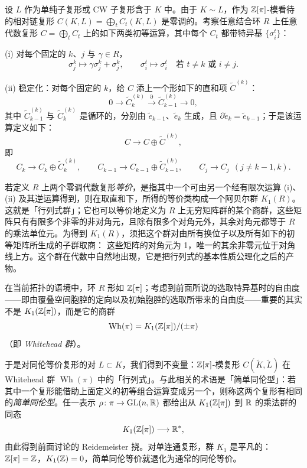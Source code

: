 设 $L$ 作为单纯子复形或 CW 子复形含于 $K$ 中。由于 $K\sim L$，作为 $\mathbb{Z}[\pi]$-模看待的相对链复形 $C(K,L)=\bigoplus_t C_t(K,L)$ 是零调的。考察任意结合环 $R$ 上任意代数复形 $C=\bigoplus_t C_t$ 上的如下两类初等运算，其中每个 $C_t$ 都带特异基 $\{\sigma^t_i\}$：

(i) 对每个固定的 $k$、$j$ 与 $\gamma\in R$，
\begin{equation}
  \sigma^k_j\mapsto\gamma\sigma^k_j+\sigma^k_j,\qquad
  \sigma^t_i\mapsto\sigma^t_i\quad\text{若 } t\neq k \text{ 或 } i\neq j. \tag{5.15}
\end{equation}

(ii) 稳定化：对每个固定的 $k$，给 $C$ 添上一个形如下的直和项 $\tilde C^{(k)}$：
\begin{equation}
  0\longrightarrow\tilde C^{(k)}_k\xrightarrow{\partial}\tilde C^{(k)}_{k-1}\longrightarrow 0, \tag{5.16}
\end{equation}
其中 $\tilde C^{(k)}_{k-1}$ 与 $\tilde C^{(k)}_k$ 是循环的，分别由 $\tilde e_{k-1}$、$\tilde e_k$ 生成，且 $\partial\tilde e_k=\tilde e_{k-1}$；于是该运算定义如下：
\[
  C\longrightarrow C\oplus\tilde C^{(k)},
\]
即
\begin{equation}
  C_k\longrightarrow C_k\oplus\tilde C^{(k)}_k,\qquad C_{k-1}\longrightarrow C_{k-1}\oplus\tilde C^{(k)}_{k-1},\qquad C_j\longrightarrow C_j\ \ (j\neq k-1,k). \tag{5.17}
\end{equation}

若定义 $R$ 上两个零调代数复形\emph{等价}，是指其中一个可由另一个经有限次运算 (i)、(ii) 及其逆运算得到，则在取直和下，所得的等价类构成一个阿贝尔群 $K_1(R)$。这就是「行列式群」；它也可以等价地定义为 $R$ 上无穷矩阵群的某个商群，这些矩阵只有有限多个非零的非对角元，且除有限多个对角元外，其余对角元都等于 $R$ 的乘法单位元。为得到 $K_1(R)$，须把这个群对由所有换位子以及所有如下的初等矩阵所生成的子群取商：
这些矩阵的对角元为 1，唯一的其余非零元位于对角线上方。这个群在代数中自然地出现，它是把行列式的基本性质公理化之后的产物。

在当前拓扑的语境中，环 $R$ 形如 $\mathbb{Z}[\pi]$；考虑到前面所说的选取特异基时的自由度——即由覆叠空间胞腔的定向以及初始胞腔的选取所带来的自由度——重要的其实不是 $K_1(\mathbb{Z}[\pi])$，而是它的商群
\[
  \operatorname{Wh}(\pi)=K_1(\mathbb{Z}[\pi])/(\pm\pi)
\]
（即 \emph{Whitehead 群}）。

于是对同伦等价复形的对 $L\subset K$，我们得到不变量：$\mathbb{Z}[\pi]$-模复形 $C(\tilde K,\tilde L)$ 在 Whitehead 群 $\operatorname{Wh}(\pi)$ 中的「行列式」。与此相关的术语是「简单同伦型」：若其中一个复形能借助上面定义的初等组合运算变成另一个，则称这两个复形有相同的\emph{简单同伦型}。任一表示 $\rho\colon\pi\to\operatorname{GL}(n,\mathbb{R})$ 都给出从 $K_1(\mathbb{Z}[\pi])$ 到 $\mathbb{R}$ 的乘法群的同态
\[
  K_1(\mathbb{Z}[\pi])\longrightarrow\mathbb{R}^*,
\]
由此得到前面讨论的 Reidemeister 挠。对单连通复形，群 $K_1$ 是平凡的：$\mathbb{Z}[\pi]=\mathbb{Z}$，$K_1(\mathbb{Z})=0$，简单同伦等价就退化为通常的同伦等价。

